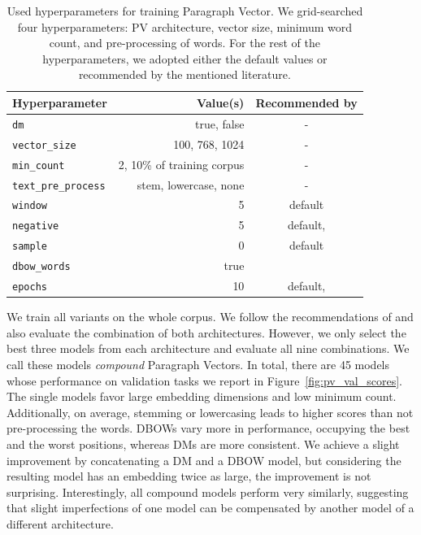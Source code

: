 \begin{table}
  \footnotesize
  \centering
  \begin{tabular}{lrc}
    \toprule
    Hyperparameter & Value(s) & Recommended by \\
    \midrule
    \texttt{dm} & true, false & - \\
    \texttt{vector\_size} & 100, 768, 1024 & - \\
    \texttt{min\_count} & 2, 10\% of training corpus& - \\
    \texttt{text\_pre\_process} & stem, lowercase, none & - \\
    \texttt{window} & 5 & default \\
    \texttt{negative} & 5 & default, \cite{lau2016empirical} \\
    \texttt{sample} & 0 & default \\
    \texttt{dbow\_words} & true & \cite{lau2016empirical} \\
    \texttt{epochs} & 10 & default, \cite{dai2015document} \\
    \bottomrule
  \end{tabular}

  \caption{Used hyperparameters for training Paragraph Vector. We grid-searched
  four hyperparameters: PV architecture, vector size, minimum word count, and
  pre-processing of words. For the rest of the hyperparameters, we adopted either the
  default values or recommended by the mentioned literature.}

  \label{table:pv_hyperparams}

\end{table}

We train all variants on the whole  corpus. We follow the
recommendations of \cite{le2014distributed} and also evaluate the combination
of both architectures. However, we only select the best three models from each
architecture and evaluate all nine combinations. We call these models
\emph{compound} Paragraph Vectors. In total, there are 45 models whose
performance on validation tasks we report in Figure~\ref{fig:pv_val_scores}.
The single models favor large embedding dimensions and low minimum count.
Additionally, on average, stemming or lowercasing leads to higher scores than
not pre-processing the words. DBOWs vary more in performance, occupying the
best and the worst positions, whereas DMs are more consistent. We achieve a
slight improvement by concatenating a DM and a DBOW model, but considering the
resulting model has an embedding twice as large, the improvement is not
surprising. Interestingly, all compound models perform very similarly,
suggesting that slight imperfections of one model can be compensated by another
model of a different architecture.

